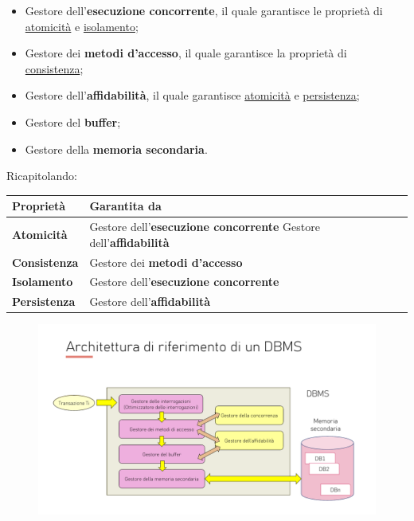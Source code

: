 \documentclass[a4paper]{article}
\begin{document}
\begin{enumerate}
\begin{itemize}
			\item Gestore dell'\textbf{esecuzione concorrente}, il quale garantisce le proprietà di \underline{atomicità} e \underline{isolamento};
			
			\item Gestore dei \textbf{metodi d'accesso}, il quale garantisce la proprietà di \underline{consistenza};
			
			\item Gestore dell'\textbf{affidabilità}, il quale garantisce \underline{atomicità} e \underline{persistenza};
			
			\item Gestore del \textbf{buffer};
			
			\item Gestore della \textbf{memoria secondaria}.
		\end{itemize}
		Ricapitolando:
		\begin{table}[!htp]
			\centering
			\begin{tabular}{@{} l p{18em} @{}}
				\toprule
				Proprietà & Garantita da \\
				\midrule
				\textbf{Atomicità} 	& Gestore dell'\textbf{esecuzione concorrente} \newline Gestore dell'\textbf{affidabilità} \\ [0.5em]
				\textbf{Consistenza}	& Gestore dei \textbf{metodi d'accesso} \\ [0.5em]
				\textbf{Isolamento} 	& Gestore dell'\textbf{esecuzione concorrente} \\ [0.5em]
				\textbf{Persistenza} & Gestore dell'\textbf{affidabilità} \\
				\bottomrule
			\end{tabular}
		\end{table}
		\begin{figure}[!htp]
			\centering
			\includegraphics[width=\textwidth]{img/ex/arch-dbms-2.pdf}
		\end{figure}
		

\end{enumerate}
\end{document}
